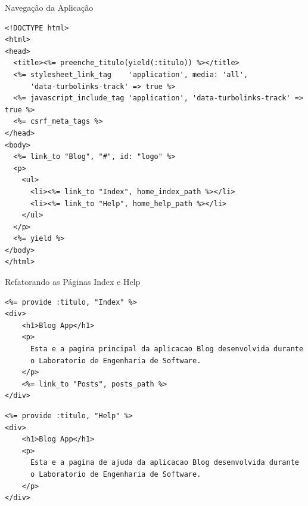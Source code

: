 \begin{frame}{Navegação da Aplicação}
      \begin{lstlisting}[style=RubyInputStyle, basicstyle=\tiny\ttfamily, caption=app/views/layouts/application.html.erb]
<!DOCTYPE html>
<html>
<head>
  <title><%= preenche_titulo(yield(:titulo)) %></title>
  <%= stylesheet_link_tag    'application', media: 'all', 
      'data-turbolinks-track' => true %>
  <%= javascript_include_tag 'application', 'data-turbolinks-track' => true %>
  <%= csrf_meta_tags %>
</head>
<body>
  <%= link_to "Blog", "#", id: "logo" %>
  <p>
    <ul>
      <li><%= link_to "Index", home_index_path %></li>
      <li><%= link_to "Help", home_help_path %></li>
    </ul>
  </p>
  <%= yield %>
</body>
</html>
      \end{lstlisting}
\end{frame} 

\begin{frame}{Refatorando as Páginas Index e Help}
   \begin{lstlisting}[style=RubyInputStyle, basicstyle=\tiny\ttfamily, caption=app/views/home/index.html.erb]
<%= provide :titulo, "Index" %>
<div>
    <h1>Blog App</h1>
    <p>
      Esta e a pagina principal da aplicacao Blog desenvolvida durante 
      o Laboratorio de Engenharia de Software.
    </p>
    <%= link_to "Posts", posts_path %>
</div>      
  \end{lstlisting}
  
   \begin{lstlisting}[style=RubyInputStyle, basicstyle=\tiny\ttfamily, caption=app/views/home/help.html.erb]
<%= provide :titulo, "Help" %>
<div>
    <h1>Blog App</h1>
    <p>
      Esta e a pagina de ajuda da aplicacao Blog desenvolvida durante 
      o Laboratorio de Engenharia de Software.
    </p>
</div>      
  \end{lstlisting}
\end{frame} 

